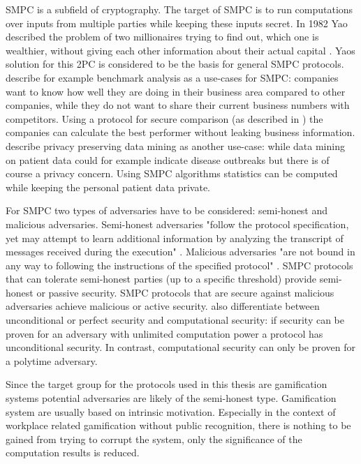 		\gls{SMPC} is a subfield of cryptography. The target of \gls{SMPC} is to run computations over inputs from multiple parties while keeping these inputs secret. In 1982 Yao described the problem of two millionaires trying to find out, which one is wealthier, without giving each other information about their actual capital \autocite{Yao1982}. Yaos solution for this \gls{2PC} is considered to be the basis for general \gls{SMPC} protocols.
		\textcite{Cramer2015} describe for example benchmark analysis as a use-cases for \gls{SMPC}: companies want to know how well they are doing in their business area compared to other companies, while they do not want to share their current business numbers with competitors. Using a protocol for secure comparison (as described in ) the companies can calculate the best performer without leaking business information. 
		\textcite{Clifton2002} describe privacy preserving data mining as another use-case: while data mining on patient data could for example indicate disease outbreaks but there is of course a privacy concern. Using \gls{SMPC} algorithms statistics can be computed while keeping the personal patient data private.
		
		For \gls{SMPC} two types of adversaries have to be considered: semi-honest and malicious adversaries.
		Semi-honest adversaries "follow the protocol specification, yet may attempt to learn additional information by analyzing the transcript of messages received during the execution" \autocite{Aumann2007}. Malicious adversaries "are not bound in any way to following the instructions of the specified protocol" \autocite{Aumann2007}.
		\gls{SMPC} protocols that can tolerate semi-honest parties (up to a specific threshold) provide semi-honest or passive security. \gls{SMPC} protocols that are secure against malicious adversaries achieve malicious or active security.
		\textcite[p. 82]{Cramer2015} also differentiate between unconditional or perfect security and computational security: if security can be proven for an adversary with unlimited computation power a protocol has unconditional security. In contrast, computational security can only be proven for a polytime adversary.
		
		Since the target group for the protocols used in this thesis are gamification systems potential adversaries are likely of the semi-honest type. Gamification system are usually based on intrinsic motivation. Especially in the context of workplace related gamification without public recognition, there is nothing to be gained from trying to corrupt the system, only the significance of the computation results is reduced.
		

